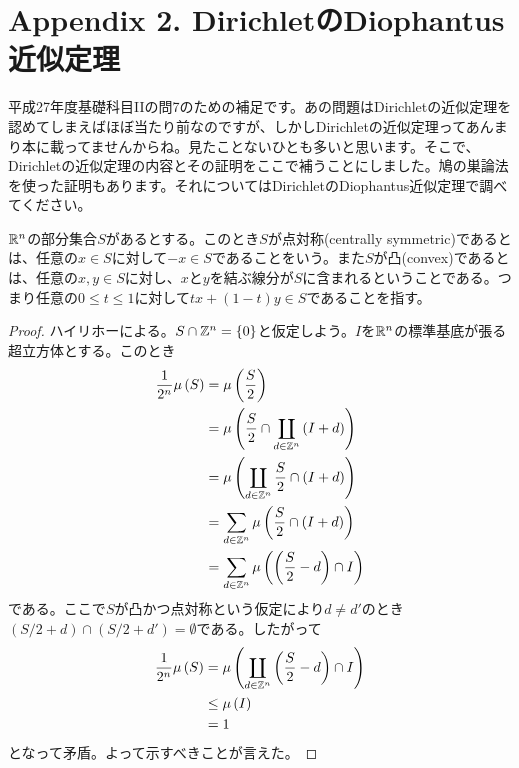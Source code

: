 

\section{Appendix 2. DirichletのDiophantus近似定理}

平成27年度基礎科目IIの問7のための補足です。あの問題はDirichletの近似定理を認めてしまえばほぼ当たり前なのですが、しかしDirichletの近似定理ってあんまり本に載ってませんからね。見たことないひとも多いと思います。そこで、Dirichletの近似定理の内容とその証明をここで補うことにしました。鳩の巣論法を使った証明もあります。それについてはDirichletのDiophantus近似定理で調べてください。




\begin{definition}
${\mathbb R}^n$の部分集合$S$があるとする。このとき$S$が点対称(centrally symmetric)であるとは、任意の$x \in S$に対して$-x \in S$であることをいう。また$S$が凸(convex)であるとは、任意の$x,y \in S$に対し、$x$と$y$を結ぶ線分が$S$に含まれるということである。つまり任意の$0 \leq t \leq 1$に対して$tx + (1-t)y \in S$であることを指す。
\end{definition}

\begin{proof}
ハイリホーによる。$S \cap {\mathbb Z}^n = \{0\}$と仮定しよう。$I$を${\mathbb R}^n$の標準基底が張る超立方体とする。このとき
\begin{align*}
\frac{1}{2^n} \mu \left( S \right) &= \mu\left(\frac{S}{2}\right) \\
&= \mu\left(\frac{S}{2} \cap \coprod_{d \in {\mathbb Z}^n} \left(I + d\right) \right) \\
&= \mu\left( \coprod_{d \in {\mathbb Z}^n}  \frac{S}{2} \cap \left(I + d\right) \right) \\
&= \sum_{d \in {\mathbb Z}^n} \mu\left(   \frac{S}{2} \cap \left(I + d\right) \right) \\
&= \sum_{d \in {\mathbb Z}^n} \mu\left(   \left(\frac{S}{2}- d\right) \cap I \right)
\end{align*}
である。ここで$S$が凸かつ点対称という仮定により$d \neq d'$のとき$(S/2 + d) \cap (S/2 + d') = \emptyset$である。したがって
\begin{align*}
\frac{1}{2^n} \mu\left(S\right) &= \mu\left(   \coprod_{d \in {\mathbb Z}^n} \left(\frac{S}{2}- d\right) \cap I \right) \\
&\leq \mu\left(I\right) \\
&= 1
\end{align*}
となって矛盾。よって示すべきことが言えた。

\end{proof}



